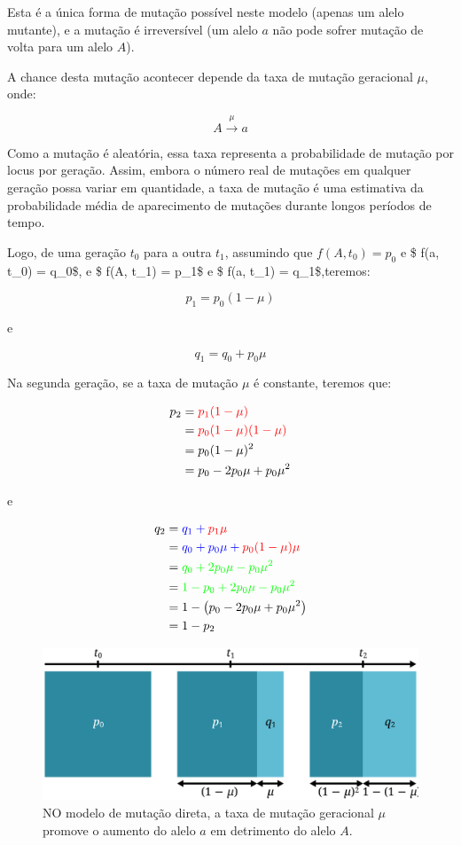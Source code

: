 \documentclass[
]{book}
\begin{document}
Esta é a única forma de mutação possível neste modelo (apenas um alelo mutante), e a mutação é irreversível (um alelo \(a\) não pode sofrer mutação de volta para um alelo \(A\)).

A chance desta mutação acontecer depende da taxa de mutação geracional \(\mu\), onde:

\[ A \overset{\mu}{\rightarrow} a\]

Como a mutação é aleatória, essa taxa representa a probabilidade de mutação por locus por geração. Assim, embora o número real de mutações em qualquer geração possa variar em quantidade, a taxa de mutação é uma estimativa da probabilidade média de aparecimento de mutações durante longos períodos de tempo.

Logo, de uma geração \(t_0\) para a outra \(t_1\), assumindo que \(f(A, t_0) = p_0\) e \$ f(a, t\_0) = q\_0\$, e \$ f(A, t\_1) = p\_1\$ e \$ f(a, t\_1) = q\_1\$,teremos:

\[ p_1 = p_0(1- \mu)\]

e

\[ q_1 = q_0 + p_0 \mu\]

Na segunda geração, se a taxa de mutação \(\mu\) é constante, teremos que:

\[
\begin{aligned}
p_2
&= \color{red}{p_1}(1- \mu) \\
&= \color{red}{p_0(1- \mu)}(1- \mu) \\
&= p_0(1- \mu)^2 \\
&= p_0 - 2p_0\mu + p_0\mu^2
\end{aligned}
\]

e

\[
\begin{aligned}
q_2
&= \color{blue}{q_1} + \color{red}{p_1} \mu \\
&= \color{blue}{q_0 + p_0 \mu}+\color{red}{p_0(1- \mu)} \mu \\
&= \color{green}{q_0} + 2p_0\mu - p_0\mu^2 \\
&= \color{green}{1-p_0} + 2p_0\mu - p_0\mu^2 \\
&= 1 - \left( p_0 - 2p_0\mu + p_0\mu^2 \right) \\
&= 1 - p_2
\end{aligned}
\]

\begin{figure}

{\centering \includegraphics[width=800px]{figs/mutation_unidirectional} 

}

\caption{NO modelo de mutação direta, a taxa de mutação geracional $μ$ promove o aumento do alelo $a$ em detrimento do alelo $A$.}\label{fig:mutation1way}
\end{figure}
\end{document}
